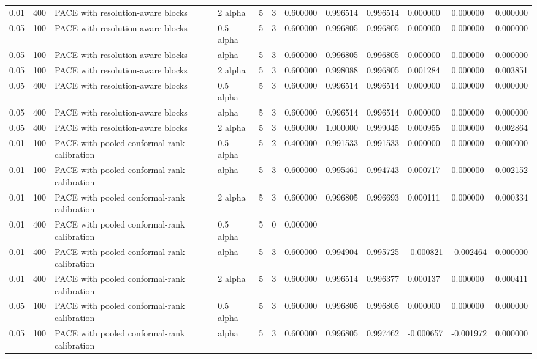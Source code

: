 \begin{tabular}{llllllllllll}
0.01 & 400 & PACE with resolution-aware blocks & 2 alpha & 5 & 3 & 0.600000 & 0.996514 & 0.996514 & 0.000000 & 0.000000 & 0.000000 \\
0.05 & 100 & PACE with resolution-aware blocks & 0.5 alpha & 5 & 3 & 0.600000 & 0.996805 & 0.996805 & 0.000000 & 0.000000 & 0.000000 \\
0.05 & 100 & PACE with resolution-aware blocks & alpha & 5 & 3 & 0.600000 & 0.996805 & 0.996805 & 0.000000 & 0.000000 & 0.000000 \\
0.05 & 100 & PACE with resolution-aware blocks & 2 alpha & 5 & 3 & 0.600000 & 0.998088 & 0.996805 & 0.001284 & 0.000000 & 0.003851 \\
0.05 & 400 & PACE with resolution-aware blocks & 0.5 alpha & 5 & 3 & 0.600000 & 0.996514 & 0.996514 & 0.000000 & 0.000000 & 0.000000 \\
0.05 & 400 & PACE with resolution-aware blocks & alpha & 5 & 3 & 0.600000 & 0.996514 & 0.996514 & 0.000000 & 0.000000 & 0.000000 \\
0.05 & 400 & PACE with resolution-aware blocks & 2 alpha & 5 & 3 & 0.600000 & 1.000000 & 0.999045 & 0.000955 & 0.000000 & 0.002864 \\
0.01 & 100 & PACE with pooled conformal-rank calibration & 0.5 alpha & 5 & 2 & 0.400000 & 0.991533 & 0.991533 & 0.000000 & 0.000000 & 0.000000 \\
0.01 & 100 & PACE with pooled conformal-rank calibration & alpha & 5 & 3 & 0.600000 & 0.995461 & 0.994743 & 0.000717 & 0.000000 & 0.002152 \\
0.01 & 100 & PACE with pooled conformal-rank calibration & 2 alpha & 5 & 3 & 0.600000 & 0.996805 & 0.996693 & 0.000111 & 0.000000 & 0.000334 \\
0.01 & 400 & PACE with pooled conformal-rank calibration & 0.5 alpha & 5 & 0 & 0.000000 &  &  &  &  &  \\
0.01 & 400 & PACE with pooled conformal-rank calibration & alpha & 5 & 3 & 0.600000 & 0.994904 & 0.995725 & -0.000821 & -0.002464 & 0.000000 \\
0.01 & 400 & PACE with pooled conformal-rank calibration & 2 alpha & 5 & 3 & 0.600000 & 0.996514 & 0.996377 & 0.000137 & 0.000000 & 0.000411 \\
0.05 & 100 & PACE with pooled conformal-rank calibration & 0.5 alpha & 5 & 3 & 0.600000 & 0.996805 & 0.996805 & 0.000000 & 0.000000 & 0.000000 \\
0.05 & 100 & PACE with pooled conformal-rank calibration & alpha & 5 & 3 & 0.600000 & 0.996805 & 0.997462 & -0.000657 & -0.001972 & 0.000000 \\

\end{tabular}
